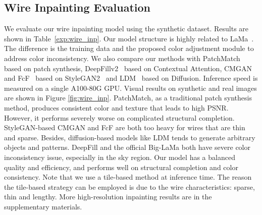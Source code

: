 \subsection{Wire Inpainting Evaluation}
\vspace{-1mm}
We evaluate our wire inpainting model using the synthetic dataset. Results are shown in Table~\ref{exp:wire_inp}. Our model structure is highly related to LaMa~\cite{suvorov2022resolution}. The difference is the training data and the proposed color adjustment module to address color inconsistency. We also compare our methods with PatchMatch \cite{barnes2009patchmatch} based on patch synthesis, DeepFillv2~\cite{yu2019free} based on Contextual Attention, CMGAN~\cite{zheng2022cm} and FcF~\cite{jain2022keys} based on StyleGAN2~\cite{karras2020analyzing} and LDM~\cite{rombach2022high} based on Diffusion. Inference speed is measured on a single A100-80G GPU. Visual results on synthetic and real images are shown in Figure \ref{fig:wire_inp}. PatchMatch, as a traditional patch synthesis method, produces consistent color and texture that leads to high PSNR. However, it performs severely worse on complicated structural completion. StyleGAN-based CMGAN and FcF are both too heavy for wires that are thin and sparse. Besides, diffusion-based models like LDM tends to generate arbitrary objects and patterns. DeepFill and the official Big-LaMa both have severe color inconsistency issue, especially in the sky region. Our model has a balanced quality and efficiency, and performs well on structural completion and color consistency. 
Note that we use a tile-based method at inference time.
The reason the tile-based strategy can be employed is due to the wire characteristics: sparse, thin and lengthy. More high-resolution inpainting results are in the supplementary materials.





